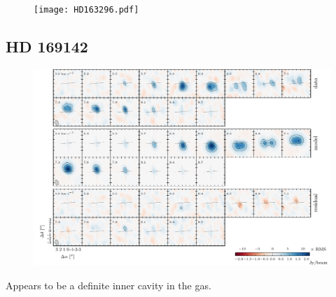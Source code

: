 \documentclass[twocolumn]{aastex6}
\begin{document}
\begin{figure}[htb]
\begin{center}
  \texttt{[image: HD163296.pdf]}
  \end{center}
\end{figure}

\subsection{HD 169142}

\begin{figure}[htb]
\begin{center}
  \includegraphics{HD169142.pdf}
  \end{center}
\end{figure}

Appears to be a definite inner cavity in the gas.
\end{document}
